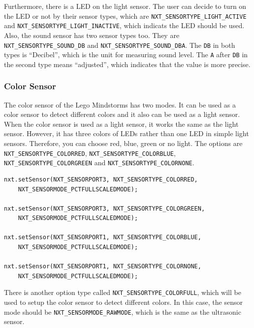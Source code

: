 \documentclass[11pt]{article}
\begin{document}
Furthermore, there is a LED on the light sensor. The user can decide to turn on 
the LED or not by their sensor types, which are {\tt NXT\_SENSORTYPE\_LIGHT\_ACTIVE}
and {\tt NXT\_SENSORTYPE\_LIGHT\_INACTIVE}, which indicats the LED should be used. 
Also, the sound sensor has two sensor types too. They are {\tt NXT\_SENSORTYPE\_SOUND\_DB} 
and {\tt NXT\_SENSORTYPE\_SOUND\_DBA}. The {\tt DB} in both types is ``Decibel'', 
which is the unit for measuring sound level. The {\tt A} after {\tt DB} in the 
second type means ``adjusted'', which indicates that the value is more precise.\\

\subsubsection*{Color Sensor}
The color sensor of the Lego Mindstorms has two modes. It can be used as a color sensor 
to detect different colors and it also can be used as a light sensor. When the color 
sensor is used as a light sensor, it works the same as the light sensor. However, 
it has three colors of LEDs rather than one LED in simple light sensors. Therefore, 
you can choose red, blue, green or no light. The options are {\tt NXT\_SENSORTYPE\_COLORRED}, 
{\tt NXT\_SENSORTYPE\_COLORBLUE}, {\tt NXT\_SENSORTYPE\_COLORGREEN} and 
{\tt NXT\_SENSORTYPE\_COLORNONE}.
\begin{lstlisting}
nxt.setSensor(NXT_SENSORPORT3, NXT_SENSORTYPE_COLORRED,
    NXT_SENSORMODE_PCTFULLSCALEDMODE);

nxt.setSensor(NXT_SENSORPORT3, NXT_SENSORTYPE_COLORGREEN,
    NXT_SENSORMODE_PCTFULLSCALEDMODE);

nxt.setSensor(NXT_SENSORPORT1, NXT_SENSORTYPE_COLORBLUE,
    NXT_SENSORMODE_PCTFULLSCALEDMODE);

nxt.setSensor(NXT_SENSORPORT1, NXT_SENSORTYPE_COLORNONE,
    NXT_SENSORMODE_PCTFULLSCALEDMODE);
\end{lstlisting}
There is another option type called {\tt NXT\_SENSORTYPE\_COLORFULL}, which will 
be used to setup the color sensor to detect different colors. In this case, the 
sensor mode should be {\tt NXT\_SENSORMODE\_RAWMODE}, which is the same as the 
ultrasonic sensor.

\newpage
\end{document}
